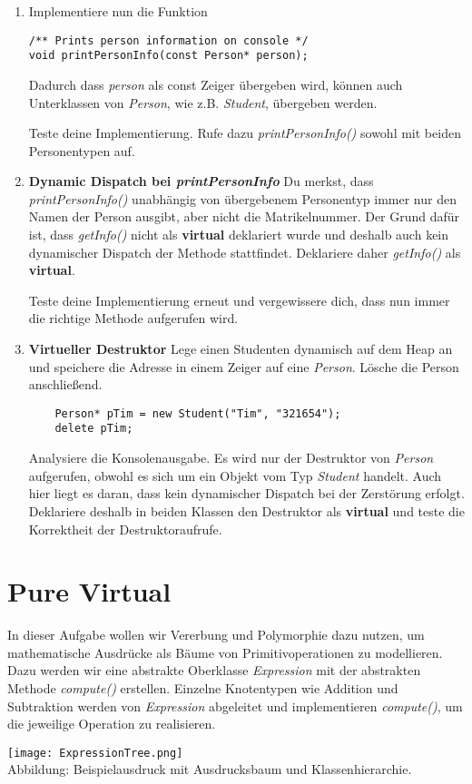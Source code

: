 \documentclass[
  accentcolor=tud1c,	%
  colorbacktitle,		%
  inverttitle,			%
  german,				%
  twoside
]{tudexercise}
\begin{document}
\begin{enumerate}
\item
Implementiere nun die Funktion 
\begin{lstlisting}
/** Prints person information on console */
void printPersonInfo(const Person* person);
\end{lstlisting}

Dadurch dass \emph{person} als const Zeiger übergeben wird, können auch Unterklassen von \emph{Person}, wie z.B. \emph{Student}, übergeben werden. 

Teste deine Implementierung. 
Rufe dazu \emph{printPersonInfo()} sowohl mit beiden Personentypen auf.

\item \textbf{Dynamic Dispatch bei \emph{printPersonInfo}}
Du merkst, dass \emph{printPersonInfo()} unabhängig von übergebenem Personentyp immer nur den Namen der Person ausgibt, aber nicht die Matrikelnummer.
Der Grund dafür ist, dass \emph{getInfo()} nicht als \textbf{virtual} deklariert wurde und deshalb auch kein dynamischer Dispatch der Methode stattfindet.
Deklariere daher \emph{getInfo()} als \textbf{virtual}.

Teste deine Implementierung erneut und vergewissere dich, dass nun immer die richtige Methode aufgerufen wird.

\item \textbf{Virtueller Destruktor}
Lege einen Studenten dynamisch auf dem Heap an und speichere die Adresse  in einem Zeiger auf eine \emph{Person}.
Lösche die Person anschließend.
\begin{lstlisting}
	Person* pTim = new Student("Tim", "321654");
	delete pTim;
\end{lstlisting}

Analysiere die Konsolenausgabe.
Es wird nur der Destruktor von \emph{Person} aufgerufen, obwohl es sich um ein Objekt vom Typ \emph{Student} handelt.
Auch hier liegt es daran, dass kein dynamischer Dispatch bei der Zerstörung erfolgt.
Deklariere deshalb in beiden Klassen den Destruktor als \textbf{virtual} und teste die Korrektheit der Destruktoraufrufe.

\end{enumerate}


\section{Pure Virtual}
In dieser Aufgabe wollen wir Vererbung und Polymorphie dazu nutzen, um mathematische Ausdrücke als Bäume von Primitivoperationen zu modellieren.
Dazu werden wir eine abstrakte Oberklasse \emph{Expression} mit der abstrakten Methode \emph{compute()} erstellen.
Einzelne Knotentypen wie Addition und Subtraktion werden von \emph{Expression} abgeleitet und implementieren \emph{compute()}, um die jeweilige Operation zu realisieren.
\begin{center}
	\texttt{[image: ExpressionTree.png]}\\
	Abbildung: Beispielausdruck mit Ausdrucksbaum und Klassenhierarchie.
\end{center}
\end{document}
